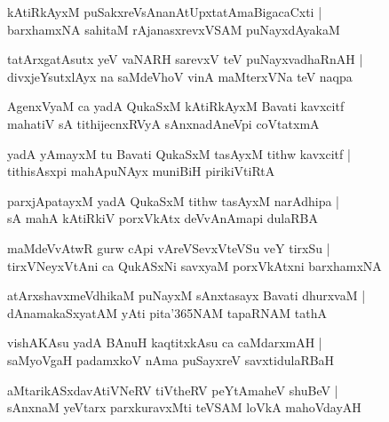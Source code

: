 \begin{shloka}
kAtiRkAyxM puSakxreVsAnanAtUpxtatAmaBigacaCxti |\\
barxhamxNA sahitaM rAjanasxrevxVSAM puNayxdAyakaM 
\end{shloka}

\begin{shloka}
tatArxgatAsutx yeV vaNARH sarevxV teV puNayxvadhaRnAH |\\
divxjeYsutxlAyx na saMdeVhoV vinA maMterxVNa teV naqpa
\end{shloka}

\begin{shloka}
AgenxVyaM ca yadA QukaSxM kAtiRkAyxM Bavati kavxcitf \\
mahatiV sA tithijecnxRVyA sAnxnadAneVpi coVtatxmA
\end{shloka}

\begin{shloka}
yadA yAmayxM tu Bavati QukaSxM tasAyxM tithw kavxcitf |\\
tithisAsxpi mahApuNAyx muniBiH pirikiVtiRtA
\end{shloka}

\begin{shloka}
parxjApatayxM yadA QukaSxM tithw tasAyxM narAdhipa |\\
sA mahA kAtiRkiV porxVkAtx deVvAnAmapi dulaRBA
\end{shloka}

\begin{shloka}
maMdeVvAtwR gurw cApi vAreVSevxVteVSu veY tirxSu |\\
tirxVNeyxVtAni ca QukASxNi savxyaM porxVkAtxni barxhamxNA
\end{shloka}

\begin{shloka}
atArxshavxmeVdhikaM puNayxM sAnxtasayx Bavati dhurxvaM |\\
dAnamakaSxyatAM yAti pita\char'365NAM tapaRNAM tathA
\end{shloka}

\begin{shloka}
vishAKAsu yadA BAnuH kaqtitxkAsu ca caMdarxmAH |\\
saMyoVgaH padamxkoV nAma puSayxreV savxtidulaRBaH
\end{shloka}

\begin{shloka}
aMtarikASxdavAtiVNeRV tiVtheRV peYtAmaheV shuBeV |\\
sAnxnaM yeVtarx parxkuravxMti teVSAM loVkA mahoVdayAH
\end{shloka}

